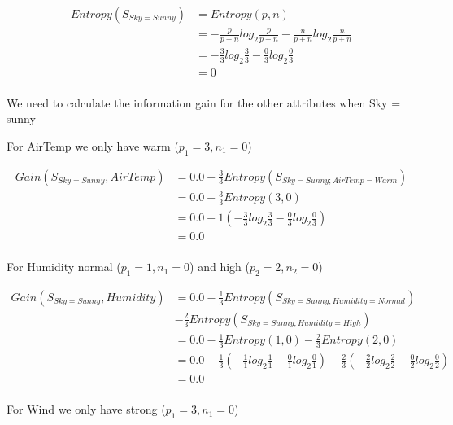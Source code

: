 \documentclass[10pt,a4paper]{article}
\begin{document}
{{{{{{{{{{\begin{equation}
\begin{split}
Entropy(S_{Sky=Sunny}) &= Entropy(p,n) \\
                       &= -\frac{p}{p+n}log_2\frac{p}{p+n} - \frac{n}{p+n}log_2\frac{n}{p+n}  \\
                       &= -\frac{3}{3} log_2\frac{3}{3} -\frac{0}{3} log_2\frac{0}{3} \\
                       &= 0   \\
\end{split}
\end{equation}

We need to calculate the information gain for the other attributes when Sky = sunny

For AirTemp we only have warm ($p_1=3,n_1=0$)

\begin{equation}
\begin{split}
Gain(S_{Sky=Sunny},AirTemp) &= 0.0 - \frac{3}{3} Entropy(S_{Sky=Sunny;AirTemp=Warm} )\\
          &= 0.0 - \frac{3}{3} Entropy(3,0) \\
          &= 0.0 - 1( -\frac{3}{3} log_2\frac{3}{3} -\frac{0}{3} log_2\frac{0}{3} )  \\
          &= 0.0 \\
\end{split}
\end{equation}

For Humidity normal ($p_1=1,n_1=0$) and high ($p_2=2,n_2=0$)

\begin{equation}
\begin{split}
Gain(S_{Sky=Sunny},Humidity) &= 0.0 - \frac{1}{3} Entropy(S_{Sky=Sunny;Humidity=Normal} ) \\
&-
    \frac{2}{3}Entropy(S_{Sky=Sunny;Humidity=High})\\
          &= 0.0 - \frac{1}{3} Entropy(1,0) - \frac{2}{3}Entropy(2,0)\\
          &= 0.0 - \frac{1}{3}( -\frac{1}{1} log_2\frac{1}{1} -\frac{0}{1} log_2\frac{0}{1} ) -\frac{2}{3}( -\frac{2}{2}log_2\frac{2}{2} - \frac{0}{2}log_2\frac{0}{2} )  \\
          &= 0.0 \\
\end{split}
\end{equation}

For Wind we only have strong ($p_1=3,n_1=0$)

}}}}}}}}}}
\end{document}
